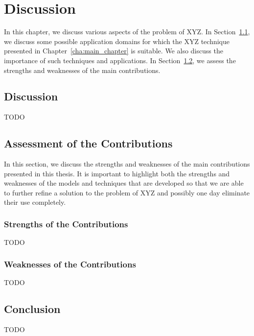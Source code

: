 \chapter{Discussion}
\label{cha:discussion}

In this chapter, we discuss various aspects of the problem of XYZ. In Section~\ref{sec:discussion}, we discuss some possible application domains for which the XYZ technique presented in Chapter~\ref{cha:main_chapter} is suitable. We also discuss the importance of such techniques and applications. In Section~\ref{sec:assessment_of_the_contributions}, we assess the strengths and weaknesses of the main contributions. 

\section{Discussion}
\label{sec:discussion}

TODO


\section{Assessment of the Contributions}
\label{sec:assessment_of_the_contributions}

In this section, we discuss the strengths and weaknesses of the main contributions presented in this thesis. It is important to highlight both the strengths and weaknesses of the models and techniques that are developed so that we are able to further refine a solution to the problem of XYZ and possibly one day eliminate their use completely.

\subsection{Strengths of the Contributions}
\label{sub:strengths_of_the_contributions}

TODO



\subsection{Weaknesses of the Contributions}
\label{sub:weaknesses_of_the_contributions}

TODO



\section{Conclusion}
\label{sec:discussion_conclusion}

TODO

